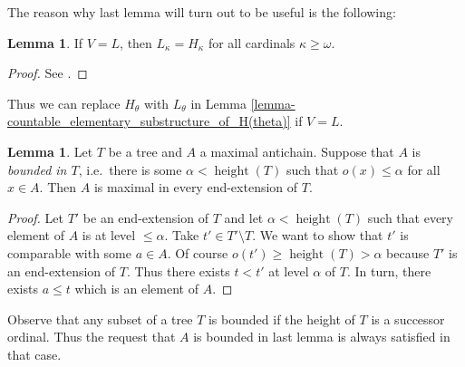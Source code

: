 \documentclass[12pt,a4paper]{report}
\theoremstyle{definition}
\newtheorem{lemma}[theorem]{Lemma}
\theoremstyle{num.custom-title}
\DeclareMathOperator{\sm}{\setminus}
\DeclareMathOperator{\height}{height}
\begin{document}
The reason why last lemma will turn out to be useful is the following:

\begin{lemma}
If $V=L$, then $L_\kappa = H_\kappa$ for all cardinals $\kappa \geq \omega$.
\begin{proof}
See \cite[p. 141]{Kun2013}.
\end{proof}
\end{lemma}

Thus we can replace $H_\theta$ with $L_\theta$ in Lemma \ref{lemma-countable_elementary_substructure_of_H(theta)} if $V=L$.

\begin{lemma}
Let $T$ be a tree and $A$ a maximal antichain. Suppose that $A$ is \emph{bounded in $T$}, i.e.\ there is some $\alpha < \height(T)$ such that $o(x) \leq \alpha$ for all $x \in A$. Then $A$ is maximal in every end-extension of $T$.
\begin{proof}
Let $T'$ be an end-extension of $T$ and let $\alpha < \height(T)$ such that every element of $A$ is at level $\leq \alpha$. Take $t' \in T' \sm T$. We want to show that $t'$ is comparable with some $a \in A$. Of course $o(t') \geq \height(T) > \alpha$ because $T'$ is an end-extension of $T$. Thus there exists $t<t'$ at level $\alpha$ of $T$. In turn, there exists $a \leq t$ which is an element of $A$.
\end{proof}
\end{lemma}

Observe that any subset of a tree $T$ is bounded if the height of $T$ is a successor ordinal. Thus the request that $A$ is bounded in last lemma is always satisfied in that case.
\end{document}
